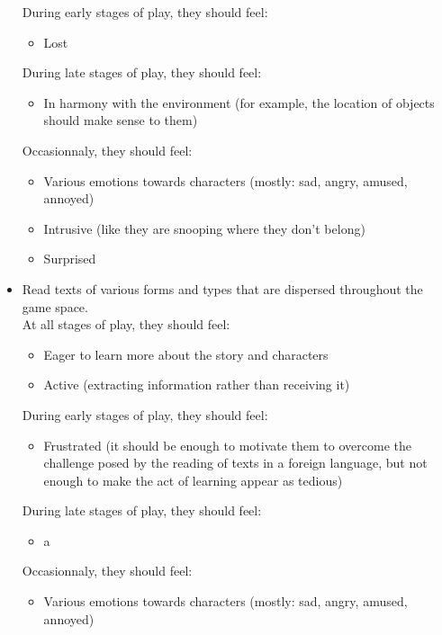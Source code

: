 \documentclass{scrartcl}
\begin{document}
\begin{itemize}
\begin{itemize}
			\end{itemize}
			During early stages of play, they should feel: 
			\begin{itemize}
				\item Lost
			\end{itemize}
			During late stages of play, they should feel:
			\begin{itemize}
				\item In harmony with the environment (for example, the location of objects should make sense to them)
			\end{itemize}
			Occasionnaly, they should feel:
			\begin{itemize}
				\item Various emotions towards characters (mostly: sad, angry, amused, annoyed)
				\item Intrusive (like they are snooping where they don't belong)
				\item Surprised
			\end{itemize}
			\item Read texts of various forms and types that are dispersed throughout the game space.\\
			At all stages of play, they should feel:
			\begin{itemize}
				\item Eager to learn more about the story and characters
				\item Active (extracting information rather than receiving it)
			\end{itemize}
			During early stages of play, they should feel: 
			\begin{itemize}
				\item Frustrated (it should be enough to motivate them to overcome the challenge posed by the reading of texts in a foreign language, but not enough to make the act of learning appear as tedious)
			\end{itemize}
			During late stages of play, they should feel:
			\begin{itemize}
				\item a
			\end{itemize}
			Occasionnaly, they should feel:
			\begin{itemize}
				\item Various emotions towards characters (mostly: sad, angry, amused, annoyed)
			\end{itemize}
			
		\end{itemize}
\end{document}
